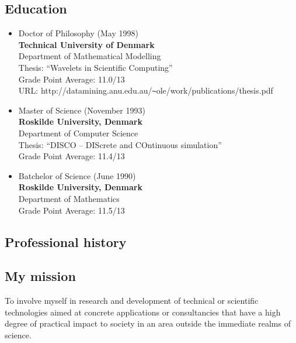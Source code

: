 \documentclass[12pt,a4paper]{article}
\begin{document}
\subsection*{Education}
\begin{itemize}
\item Doctor of Philosophy (May 1998) \\
{\bf Technical University of Denmark} \\ 
Department of Mathematical Modelling  \\
Thesis: ``Wavelets in Scientific Computing''\\
Grade Point Average: 11.0/13\\    %
URL: http://datamining.anu.edu.au/\verb+~+ole/work/publications/thesis.pdf

\item  Master of Science (November 1993) \\
{\bf Roskilde University, Denmark} \\
Department of Computer Science \\ 
Thesis: ``DISCO -- DIScrete and COntinuous simulation''\\ 
Grade Point Average: 11.4/13  %

\item  Batchelor of Science (June 1990) \\
{\bf Roskilde University, Denmark} \\
Department of Mathematics \\ 
Grade Point Average: 11.5/13  %
\end{itemize}

\newpage

\subsection*{Professional history}



\subsection*{My mission}
To involve myself in research and development of  
technical or scientific technologies aimed at
concrete applications or consultancies 
that have a high degree of practical impact to society in 
an area outside the immediate realms of science. 
\end{document}
